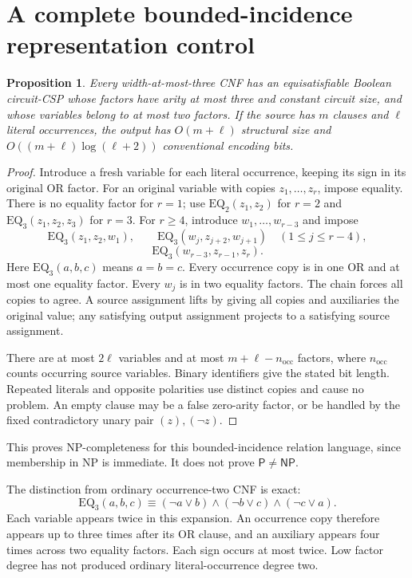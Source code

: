 \documentclass[11pt]{article}
\newtheorem{proposition}{Proposition}
\newcommand{\Pclass}{\mathsf P}
\newcommand{\NP}{\mathsf{NP}}
\begin{document}
\section{A complete bounded-incidence representation control}
\begin{proposition}
Every width-at-most-three CNF has an equisatisfiable Boolean circuit-CSP
whose factors have arity at most three and constant circuit size, and whose
variables belong to at most two factors.
If the source has $m$ clauses and $\ell$ literal occurrences, the output has
$O(m+\ell)$ structural size and
$O((m+\ell)\log(\ell+2))$ conventional encoding bits.
\end{proposition}
\begin{proof}
Introduce a fresh variable for each literal occurrence, keeping its sign in
its original OR factor. For an original variable with copies $z_1,\ldots,z_r$,
impose equality. There is no equality factor for $r=1$; use
$\mathrm{EQ}_2(z_1,z_2)$ for $r=2$ and
$\mathrm{EQ}_3(z_1,z_2,z_3)$ for $r=3$.
For $r\ge4$, introduce $w_1,\ldots,w_{r-3}$ and impose
\[
 \mathrm{EQ}_3(z_1,z_2,w_1),\qquad
 \mathrm{EQ}_3(w_j,z_{j+2},w_{j+1})\quad(1\le j\le r-4),
\]
\[
 \mathrm{EQ}_3(w_{r-3},z_{r-1},z_r).
\]
Here $\mathrm{EQ}_3(a,b,c)$ means $a=b=c$. Every occurrence copy is in
one OR and at most one equality factor. Every $w_j$ is in two equality
factors. The chain forces all copies to agree. A source assignment lifts by
giving all copies and auxiliaries the original value; any satisfying output
assignment projects to a satisfying source assignment.

There are at most $2\ell$ variables and at most
$m+\ell-n_{\mathrm{occ}}$ factors, where $n_{\mathrm{occ}}$ counts occurring
source variables. Binary identifiers give the stated bit length.
Repeated literals and opposite polarities use distinct copies and cause no
problem. An empty clause may be a false zero-arity factor, or be handled by
the fixed contradictory unary pair $(z),(\neg z)$.
\end{proof}

This proves NP-completeness for this bounded-incidence relation language,
since membership in NP is immediate. It does not prove $\Pclass\ne\NP$.

The distinction from ordinary occurrence-two CNF is exact:
\[
 \mathrm{EQ}_3(a,b,c)\equiv
 (\neg a\lor b)\land(\neg b\lor c)\land(\neg c\lor a).
\]
Each variable appears twice in this expansion. An occurrence copy therefore
appears up to three times after its OR clause, and an auxiliary appears four
times across two equality factors. Each sign occurs at most twice.
Low factor degree has not produced ordinary literal-occurrence degree two.
\end{document}
